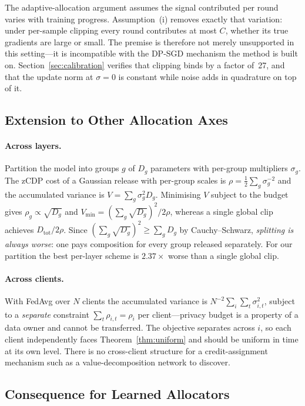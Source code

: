 The adaptive-allocation argument assumes the signal contributed per round varies
with training progress. Assumption~(i) removes exactly that variation: under
per-sample clipping every round contributes at most $C$, whether its true
gradients are large or small. The premise is therefore not merely unsupported in
this setting---it is incompatible with the DP-SGD mechanism the method is built
on. Section~\ref{sec:calibration} verifies that clipping binds by a factor
of~\num{27}, and that the update norm at $\sigma=0$ is constant while noise adds
in quadrature on top of it.

\subsection{Extension to Other Allocation Axes}

\paragraph{Across layers.} Partition the model into groups $g$ of $D_g$
parameters with per-group multipliers $\sigma_g$. The zCDP cost of a Gaussian
release with per-group scales is $\rho=\tfrac12\sum_g \sigma_g^{-2}$ and the
accumulated variance is $V=\sum_g \sigma_g^{2}D_g$. Minimising $V$ subject to the
budget gives $\rho_g \propto \sqrt{D_g}$ and
$V_{\min} = (\sum_g\sqrt{D_g})^{2}/2\rho$, whereas a single global clip achieves
$D_{\text{tot}}/2\rho$. Since $(\sum_g \sqrt{D_g})^{2}\ge \sum_g D_g$ by
Cauchy--Schwarz, \emph{splitting is always worse}: one pays composition for every
group released separately. For our partition the best per-layer scheme is
$2.37\times$ worse than a single global clip.

\paragraph{Across clients.} With FedAvg over $N$ clients the accumulated variance
is $N^{-2}\sum_i\sum_t \sigma_{i,t}^2$, subject to a \emph{separate} constraint
$\sum_t\rho_{i,t}=\rho_i$ per client---privacy budget is a property of a data
owner and cannot be transferred. The objective separates across $i$, so each
client independently faces Theorem~\ref{thm:uniform} and should be uniform in
time at its own level. There is no cross-client structure for a
credit-assignment mechanism such as a value-decomposition network to discover.

\subsection{Consequence for Learned Allocators}


